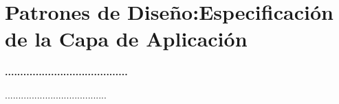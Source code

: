 \section{ Patrones de Diseño:Especificación de la Capa de Aplicación} 
\textbf{........................................}\\
\begin{flushleft}
......................................
\end{flushleft}